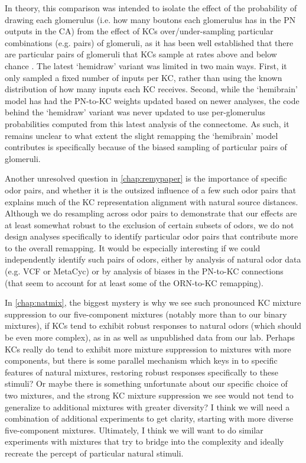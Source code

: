 \documentclass[12pt]{caltech_thesis}
\renewcommand{\cite}{{ }\autocite}
\begin{document}
\begin{refsection}
In theory, this comparison was intended to isolate the effect of the probability of drawing each glomerulus (i.e. how many boutons each glomerulus has in the PN outputs in the CA) from the effect of KCs over/under-sampling particular combinations (e.g. pairs) of glomeruli, as it has been well established that there are particular pairs of glomeruli that KCs sample at rates above and below chance\cite{CommunityPNs}.
The latest `hemidraw' variant was limited in two main ways.
First, it only sampled a fixed number of inputs per KC, rather than using the known distribution of how many inputs each KC receives.
Second, while the `hemibrain' model has had the PN-to-KC weights updated based on newer analyses, the code behind the `hemidraw' variant was never updated to use per-glomerulus probabilities computed from this latest analysis of the connectome.
As such, it remains unclear to what extent the slight remapping the `hemibrain' model contributes is specifically because of the biased sampling of particular pairs of glomeruli.

Another unresolved question in \autoref{chap:remypaper} is the importance of specific odor pairs, and whether it is the outsized influence of a few such odor pairs that explains much of the KC representation alignment with natural source distances.
Although we do resampling across odor pairs to demonstrate that our effects are at least somewhat robust to the exclusion of certain subsets of odors, we do not design analyses specifically to identify particular odor pairs that contribute more to the overall remapping.
It would be especially interesting if we could independently identify such pairs of odors, either by analysis of natural odor data (e.g. VCF or MetaCyc) or by analysis of biases in the PN-to-KC connections (that seem to account for at least some of the ORN-to-KC remapping).

In \autoref{chap:natmix}, the biggest mystery is why we see such pronounced KC mixture suppression to our five-component mixtures (notably more than to our binary mixtures), if KCs tend to exhibit robust responses to natural odors (which should be even more complex), as in \textcite{Honegger2011} as well as unpublished data from our lab.
Perhaps KCs really do tend to exhibit more mixture suppression to mixtures with more components, but there is some parallel mechanism which keys in to specific features of natural mixtures, restoring robust responses specifically to these stimuli?
Or maybe there is something unfortunate about our specific choice of two mixtures, and the strong KC mixture suppression we see would not tend to generalize to additional mixtures with greater diversity?
I think we will need a combination of additional experiments to get clarity, starting with more diverse five-component mixtures.
Ultimately, I think we will want to do similar experiments with mixtures that try to bridge into the complexity and ideally recreate the percept of particular natural stimuli.


\end{refsection}
\end{document}
